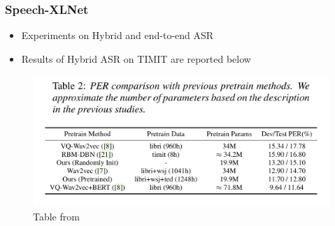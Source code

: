 \documentclass[table]{beamer}
\begin{document}
\begin{frame}
\frametitle{Speech-XLNet}

		\begin{itemize}
			\item Experiments on Hybrid and end-to-end ASR
			\item Results of Hybrid ASR on TIMIT are reported below
		\end{itemize} 


		\begin{figure}
			\centering
			\includegraphics[scale=0.35]	{speechXLNETtable} 
			\caption{Table from  \citep{song2019speechxlnet}}
			\end{figure}

\end{frame}
\end{document}
